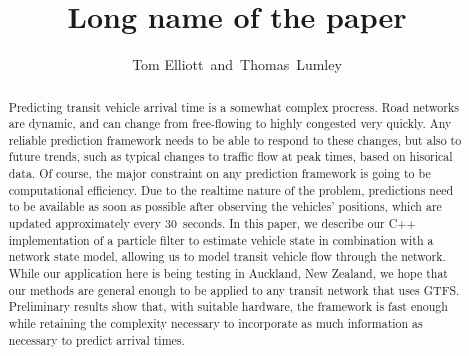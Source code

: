 \documentclass[times, doublespace]{anzsauth}
\begin{document}
\cleanlookdateon
{}
\title{Long name of the paper}
\author{Tom Elliott\corrauth~and~Thomas~Lumley}
\address{
    Department of Statistics, University of Auckland, 
    Auckland 1142, New Zealand\\
    Email: \texttt{tom.elliott@auckland.ac.nz}
}

\begin{abstract}
Predicting transit vehicle arrival time is a somewhat complex procress.
Road networks are dynamic, and can change from free-flowing to highly congested
very quickly.
Any reliable prediction framework needs to be able to respond to these changes,
but also to future trends, such as typical changes to traffic flow
at peak times, based on hisorical data.
Of course, the major constraint on any prediction framework is going to be
computational efficiency.
Due to the realtime nature of the problem, predictions need to be 
available as soon as possible after observing the vehicles' positions,
which are updated approximately every 30~seconds.
In this paper, we describe our C++ implementation of a particle filter to estimate
vehicle state in combination with a network state model,
allowing us to model transit vehicle flow through the network.
While our application here is being testing in Auckland, New Zealand,
we hope that our methods are general enough to be applied to any
transit network that uses GTFS.
Preliminary results show that, with suitable hardware,
the framework is fast enough while retaining the complexity necessary
to incorporate as much information as necessary to predict arrival times.
\end{abstract}


\maketitle








\end{document}
